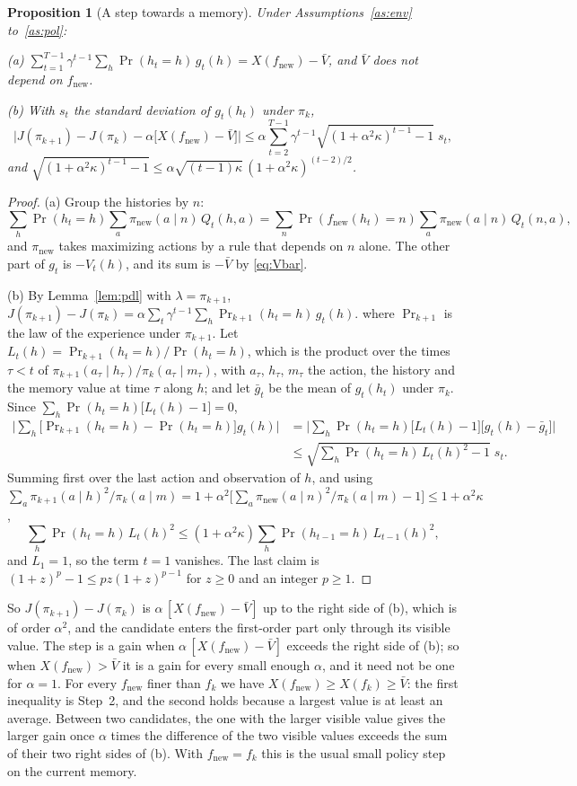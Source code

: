 \documentclass[11pt]{article}
\newtheorem{proposition}{Proposition}
\theoremstyle{definition}
\newcommand{\Prn}{\Pr\nolimits_{k+1}}
\newcommand{\fn}{f_{\mathrm{new}}}
\newcommand{\pn}{\pi_{\mathrm{new}}}
\newcommand{\why}[1]{\tag*{\small(#1)}}
\begin{document}
\begin{proposition}[A step towards a memory]\label{prop:step}
Under Assumptions~\ref{as:env} to~\ref{as:pol}:

(a) $\displaystyle\sum_{t=1}^{T-1}\gamma^{t-1}\sum_h\Pr(h_t=h)\,g_t(h)=X(\fn)-\bar V$, and $\bar V$ does not depend on $\fn$.

(b) With $s_t$ the standard deviation of $g_t(h_t)$ under $\pi_k$,
\[
\Big|J(\pi_{k+1})-J(\pi_k)-\alpha\big[X(\fn)-\bar V\big]\Big|\le\alpha\sum_{t=2}^{T-1}\gamma^{t-1}\sqrt{(1+\alpha^2\kappa)^{t-1}-1}\;s_t ,
\]
and $\sqrt{(1+\alpha^2\kappa)^{t-1}-1}\le\alpha\sqrt{(t-1)\kappa}\,(1+\alpha^2\kappa)^{(t-2)/2}$.
\end{proposition}
\begin{proof}
(a) Group the histories by $n$:
\[
\sum_h\Pr(h_t=h)\sum_a\pn(a\mid n)\,Q_t(h,a)=\sum_n\Pr(\fn(h_t)=n)\sum_a\pn(a\mid n)\,Q_t(n,a),
\]
and $\pn$ takes maximizing actions by a rule that depends on $n$ alone. The other part of $g_t$ is $-V_t(h)$, and its sum is $-\bar V$ by \eqref{eq:Vbar}.

(b) By Lemma~\ref{lem:pdl} with $\lambda=\pi_{k+1}$, $J(\pi_{k+1})-J(\pi_k)=\alpha\sum_t\gamma^{t-1}\sum_h\Prn(h_t=h)\,g_t(h)$. where $\Prn$ is the law of the experience under $\pi_{k+1}$. Let $L_t(h)=\Prn(h_t=h)/\Pr(h_t=h)$, which is the product over the times $\tau<t$ of $\pi_{k+1}(a_\tau\mid h_\tau)/\pi_k(a_\tau\mid m_\tau)$, with $a_\tau$, $h_\tau$, $m_\tau$ the action, the history and the memory value at time $\tau$ along $h$; and let $\bar g_t$ be the mean of $g_t(h_t)$ under $\pi_k$. Since $\sum_h\Pr(h_t=h)\big[L_t(h)-1\big]=0$,
\begin{align*}
\Big|\sum_h\big[\Prn(h_t=h)-\Pr(h_t=h)\big]g_t(h)\Big|&=\Big|\sum_h\Pr(h_t=h)\big[L_t(h)-1\big]\big[g_t(h)-\bar g_t\big]\Big|\\
&\le\sqrt{\sum_h\Pr(h_t=h)\,L_t(h)^2-1}\;s_t \why{Cauchy--Schwarz}.
\end{align*}
Summing first over the last action and observation of $h$, and using $\sum_a\pi_{k+1}(a\mid h)^2/\pi_k(a\mid m)=1+\alpha^2\big[\sum_a\pn(a\mid n)^2/\pi_k(a\mid m)-1\big]\le1+\alpha^2\kappa$,
\[
\sum_h\Pr(h_t=h)\,L_t(h)^2\le(1+\alpha^2\kappa)\sum_h\Pr(h_{t-1}=h)\,L_{t-1}(h)^2,
\]
and $L_1=1$, so the term $t=1$ vanishes. The last claim is $(1+z)^p-1\le pz(1+z)^{p-1}$ for $z\ge0$ and an integer $p\ge1$.
\end{proof}

So $J(\pi_{k+1})-J(\pi_k)$ is $\alpha\,[X(\fn)-\bar V]$ up to the right side of (b), which is of order $\alpha^2$, and the candidate enters the first-order part only through its visible value. The step is a gain when $\alpha\,[X(\fn)-\bar V]$ exceeds the right side of (b); so when $X(\fn)>\bar V$ it is a gain for every small enough $\alpha$, and it need not be one for $\alpha=1$. For every $\fn$ finer than $f_k$ we have $X(\fn)\ge X(f_k)\ge\bar V$: the first inequality is Step~2, and the second holds because a largest value is at least an average. Between two candidates, the one with the larger visible value gives the larger gain once $\alpha$ times the difference of the two visible values exceeds the sum of their two right sides of (b). With $\fn=f_k$ this is the usual small policy step on the current memory.
\end{document}
